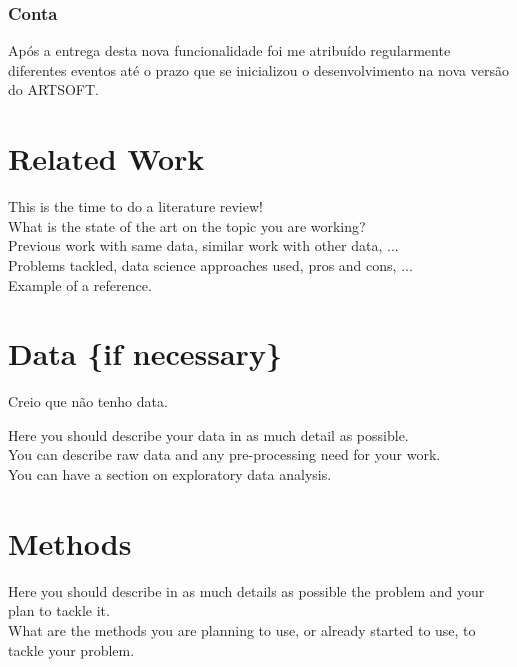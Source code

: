 \documentclass[sigplan]{acmart}
\begin{document}
\subsubsection{Conta}

 Após a entrega desta nova funcionalidade foi me atribuído regularmente diferentes eventos até o prazo que se inicializou o desenvolvimento na nova versão do ARTSOFT.

\section{Related Work} \label{sec:relatedwork}

This is the time to do a literature review! \\

What is the state of the art on the topic you are working? \\

Previous work with same data, similar work with other data, ... \\

Problems tackled, data science approaches used, pros and cons, ... \\ 


Example of a reference\cite{subversion}.

\section{Data \{if necessary\} } \label{sec:data}

Creio que não tenho data.

Here you should describe your data in as much detail as possible. \\ 

You can describe raw data and any pre-processing need for your work. \\

You can have a section on exploratory data analysis. \\

\section{Methods} \label{sec:methods}

Here you should describe in as much details as possible the problem and your plan to tackle it. \\

What are the methods you are planning to use, or already started to use, to tackle your problem. \\
\end{document}
